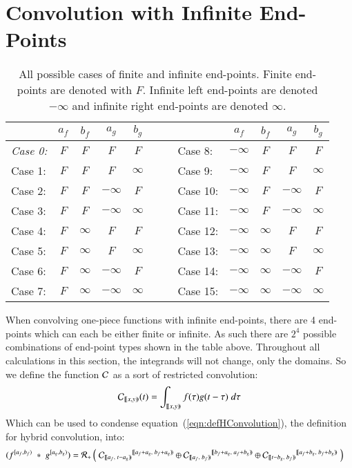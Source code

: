 \chapter{Convolution with Infinite End-Points}
\label{chp:16cases}


\begin{table}[h]
\caption[Possible combinations of finite and infinite end-points]{
	All possible cases of finite and infinite end-points. Finite end-points are denoted with $F$. Infinite left end-points are denoted 	
	$-\infty$ and infinite right end-points are denoted $\infty$.
	\label{fig:16cases}}
\centering
\begin{tabular}{| l || c | c | c | c || r || l ||  c | c | c | c |}
	\hline
		& $a_f$		& $b_f$		& $a_g$		& $b_g$	&$\;\;\;\;$&	& $a_f$		& $b_f$		& $a_g$		& $b_g$	\\
	\hline 
\textit{Case 0:}& $F$	& $F$		& $F$		& $F$	&&	Case 8:	& $-\infty$	& $F$		& $F$		& $F$	\\
Case 1:	& $F$		& $F$		& $F$		& $\infty$&&	Case 9:	& $-\infty$	& $F$		& $F$		& $\infty$ \\
Case 2:	& $F$		& $F$		& $-\infty$	& $F$	&&	Case 10:	& $-\infty$	& $F$		& $-\infty$	& $F$	\\
Case 3:	& $F$		& $F$		& $-\infty$	& $\infty$&&	Case 11:	& $-\infty$	& $F$		& $-\infty$	& $\infty$ \\
Case 4:	& $F$		& $\infty$	& $F$		& $F$	&&	Case 12:	& $-\infty$	& $\infty$	& $F$		& $F$	\\
Case 5:	& $F$		& $\infty$ 	& $F$		& $\infty$&&	Case 13:	& $-\infty$	& $\infty$ 	& $F$		& $\infty$ \\
Case 6:	& $F$		& $\infty$ 	& $-\infty$	& $F$	&&	Case 14:	& $-\infty$	& $\infty$ 	& $-\infty$	& $F$	\\
Case 7:	& $F$		& $\infty$ 	& $-\infty$	& $\infty$&&	Case 15:	& $-\infty$	& $\infty$ 	& $-\infty$	& $\infty$ \\
	\hline
\end{tabular}
\end{table}


When convolving one-piece functions with infinite end-points, there are 4 end-points which can each be either finite or infinite.
As such there are $2^4$ possible combinations of end-point types shown in the table above.
Throughout all calculations in this section, the integrands will not change, only the domains.
So we define the function $\C$ as a sort of restricted convolution:
\begin{equation}
	\C[ [\![x,y)\!) ](t) = \int_{[\![x,y)\!)} f(\tau) g(t-\tau) \; d\tau
\end{equation}
Which can be used to condense equation~(\ref{eqn:defHConvolution}), the definition for hybrid convolution, into:
\begin{align*}
	\label{eqn:defHConvolution2}
	(f^{[a_f,b_f)} \;*\; g^{[a_g,b_g)})
		= \R[+] &\left( \; 
			{\C[ [\![a_f,\;t-a_g)\!) ]}^{[\![a_f+a_g,\; b_f+a_g)\!)} \oplus
			{\C[ [\![a_f,\;b_f)\!) ]}^{[\![b_f+a_g,\; a_f+b_g)\!)} \oplus
			{\C[ [\![t-b_g,\;b_f)\!) ]}^{[\![a_f+b_g,\; b_f+b_g)\!)} 
		\; \right)
\end{align*}


